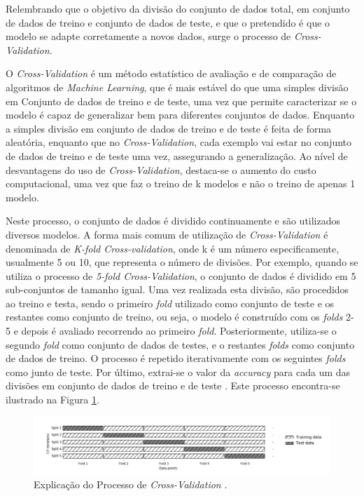 \documentclass[12pt,a4paper,twoside]{report}
\begin{document}
{Relembrando que o objetivo da divisão do conjunto de dados total, em conjunto de dados de treino e conjunto de dados de teste, e que o pretendido é que o modelo se adapte corretamente  a novos dados, surge o processo de \textit{Cross-Validation}.

O \textit{Cross-Validation} é um método estatístico de avaliação e de comparação de algoritmos de \textit{Machine Learning}, que é mais estável do que uma simples divisão em Conjunto de dados de treino e de teste, uma vez que permite caracterizar se o modelo é capaz de generalizar bem para diferentes conjuntos de dados. Enquanto a simples divisão em conjunto de dados de treino e de teste é feita de forma aleatória, enquanto que no \textit{Cross-Validation}, cada exemplo vai estar no conjunto de dados de treino e de teste uma vez, assegurando a generalização. Ao nível de desvantagens do uso de \textit{Cross-Validation}, destaca-se o aumento do custo computacional, uma vez que faz o treino de k modelos e não o treino de apenas 1 modelo.

Neste processo, o conjunto de dados é dividido continuamente e são utilizados diversos modelos. A forma mais comum de utilização de \textit{Cross-Validation} é denominada de \textit{K-fold Cross-validation}, onde k é um número especificamente, usualmente 5 ou 10, que representa o número de divisões. Por exemplo, quando se utiliza o processo de \textit{5-fold Cross-Validation}, o conjunto de dados é dividido em 5 sub-conjuntos de tamanho igual. Uma vez realizada esta divisão, são procedidos ao treino e testa, sendo o primeiro \textit{fold} utilizado como conjunto de teste e os restantes como conjunto de treino, ou seja, o modelo é construído com os \textit{folds} 2-5 e depois é avaliado recorrendo ao primeiro \textit{fold}. Posteriormente, utiliza-se o segundo \textit{fold} como conjunto de dados de testes, e o restantes \textit{folds} como conjunto de dados de treino. O processo é repetido iterativamente com os seguintes \textit{folds} como junto de teste. Por último, extrai-se o valor da \textit{accuracy} para cada um das divisões em conjunto de dados de treino e de teste \cite{müller2016introduction}. Este processo encontra-se ilustrado na Figura \ref{fig:cross}.

\begin{figure}[H]
    \centering
    \includegraphics[width=1\textwidth]{imagens/cross-validation.png}
    \caption{Explicação do Processo de \textit{Cross-Validation} \cite{müller2016introduction}.}
    \label{fig:cross}
\end{figure}

}
\end{document}
